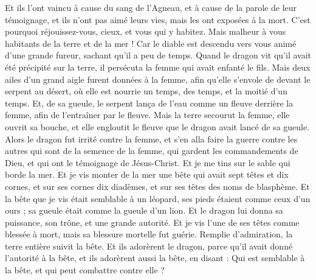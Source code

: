 \begin{multicols}{2}
Et ils l'ont vaincu à cause du sang de l'Agneau, et à cause de la parole de leur témoignage, et ils n'ont pas aimé leurs vies, mais les ont exposées à la mort.
C'est pourquoi réjouissez-vous, cieux, et vous qui y habitez. Mais malheur à vous habitants de la terre et de la mer ! Car le diable est descendu vers vous animé d'une grande fureur, sachant qu'il a peu de temps.
Quand le dragon vit qu'il avait été précipité sur la terre, il persécuta la femme qui avait enfanté le fils.
Mais deux ailes d'un grand aigle furent données à la femme, afin qu'elle s'envole de devant le serpent au désert, où elle est nourrie un temps, des temps, et la moitié d'un temps.
Et, de sa gueule, le serpent lança de l'eau comme un fleuve derrière la femme, afin de l'entraîner par le fleuve.
Mais la terre secourut la femme, elle ouvrit sa bouche, et elle engloutit le fleuve que le dragon avait lancé de sa gueule.
Alors le dragon fut irrité contre la femme, et s'en alla faire la guerre contre les autres qui sont de la semence de la femme, qui gardent les commandements de Dieu, et qui ont le témoignage de Jésus-Christ.
Et je me tins sur le sable qui borde la mer.
\VerseOne{}Et je vis monter de la mer une bête qui avait sept têtes et dix cornes, et sur ses cornes dix diadèmes, et sur ses têtes des noms de blasphème.
Et la bête que je vis était semblable à un léopard, ses pieds étaient comme ceux d'un ours ; sa gueule était comme la gueule d'un lion. Et le dragon lui donna sa puissance, son trône, et une grande autorité.
Et je vis l'une de ses têtes comme blessée à mort, mais sa blessure mortelle fut guérie. Remplie d'admiration, la terre entière suivit la bête.
Et ils adorèrent le dragon, parce qu'il avait donné l'autorité à la bête, et ils adorèrent aussi la bête, en disant : Qui est semblable à la bête, et qui peut combattre contre elle ?

\end{multicols}
